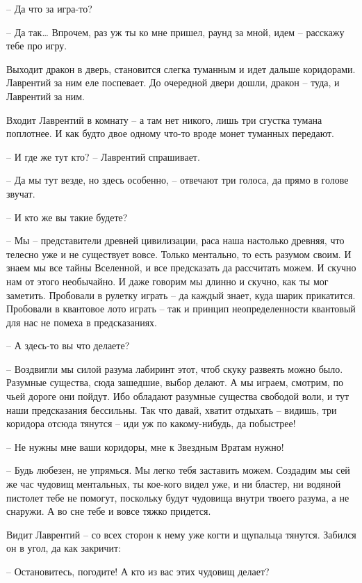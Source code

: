 \documentclass[ebook,oneside,final,openright]{memoir}
\begin{document}
– Да что за игра-то?\par
– Да так… Впрочем, раз уж ты ко мне пришел, раунд за мной, идем – расскажу тебе про игру.\par
\par
Выходит дракон в дверь, становится слегка туманным и идет дальше коридорами. Лаврентий за ним еле поспевает. До очередной двери дошли, дракон – туда, и Лаврентий за ним. \par
Входит Лаврентий в комнату – а там нет никого, лишь три сгустка тумана поплотнее. И как будто двое одному что-то вроде монет туманных передают.\par
– И где же тут кто? – Лаврентий спрашивает.\par
– Да мы тут везде, но здесь особенно, – отвечают три голоса, да прямо в голове звучат.\par
– И кто же вы такие будете?\par
– Мы – представители древней цивилизации, раса наша настолько древняя, что телесно уже и не существует вовсе. Только ментально, то есть разумом своим. И знаем мы все тайны Вселенной, и все предсказать да рассчитать можем. И скучно нам от этого необычайно. И даже говорим мы длинно и скучно, как ты мог заметить. Пробовали в рулетку играть – да каждый знает, куда шарик прикатится. Пробовали в квантовое лото играть – так и принцип неопределенности квантовый для нас не помеха в предсказаниях.\par
– А здесь-то вы что делаете?\par
– Воздвигли мы силой разума лабиринт этот, чтоб скуку развеять можно было. Разумные существа, сюда зашедшие, выбор делают. А мы играем, смотрим, по чьей дороге они пойдут. Ибо обладают разумные существа свободой воли, и тут наши предсказания бессильны. Так что давай, хватит отдыхать – видишь, три коридора отсюда тянутся – иди уж по какому-нибудь, да побыстрее!\par
– Не нужны мне ваши коридоры, мне к Звездным Вратам нужно!\par
– Будь любезен, не упрямься. Мы легко тебя заставить можем. Создадим мы сей же час чудовищ ментальных, ты кое-кого видел уже, и ни бластер, ни водяной пистолет тебе не помогут, поскольку будут чудовища внутри твоего разума, а не снаружи. А во сне тебе и вовсе тяжко придется.\par
\par
Видит Лаврентий – со всех сторон к нему уже когти и щупальца тянутся. Забился он в угол, да как закричит:\par
– Остановитесь, погодите! А кто из вас этих чудовищ делает?\par
\end{document}
